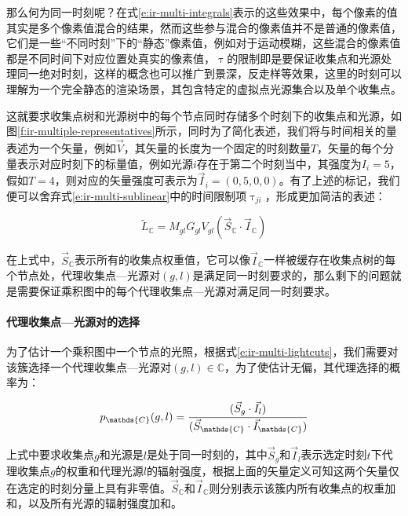 那么何为同一时刻呢？在式\ref{e:ir-multi-integrals}表示的这些效果中，每个像素的值其实是多个像素值混合的结果，然而这些参与混合的像素值并不是普通的像素值，它们是一些“不同时刻”下的“静态”像素值，例如对于运动模糊，这些混合的像素值都是不同时间下对应位置处真实的像素值，$\uptau$的限制即是要保证收集点和光源处理同一绝对时刻，这样的概念也可以推广到景深，反走样等效果，这里的时刻可以理解为一个完全静态的渲染场景，其包含特定的虚拟点光源集合以及单个收集点。

这就要求收集点树和光源树中的每个节点同时存储多个时刻下的收集点和光源，如图\ref{f:ir-multiple-representatives}所示，同时为了简化表述，我们将与时间相关的量表述为一个矢量，例如$\vec{V}$，其矢量的长度为一个固定的时刻数量$T$，矢量的每个分量表示对应时刻下的标量值，例如光源$i$存在于第二个时刻当中，其强度为$I_i=5$，假如$T=4$，则对应的矢量强度可表示为$\vec{I}_i=(0,5,0,0)$。有了上述的标记，我们便可以舍弃式\ref{e:ir-multi-sublinear}中的时间限制项$\uptau_{ji}$，形成更加简洁的表述：

\begin{equation}\label{e:ir-multi-lightcuts}
	\tilde{L}_{\mathds{C}}=M_{gl}G_{gl}V_{gl}(\vec{S}_{\mathds{C}}\cdot \vec{I}_{\mathds{C}})
\end{equation}

\noindent 在上式中，$\vec{S}_{\mathds{C}}$表示所有的收集点权重值，它可以像$\vec{I}_{\mathds{C}}$一样被缓存在收集点树的每个节点处，代理收集点—光源对$(g,l)$是满足同一时刻要求的，那么剩下的问题就是需要保证乘积图中的每个代理收集点—光源对满足同一时刻要求。




\paragraph{代理收集点—光源对的选择}
为了估计一个乘积图中一个节点的光照，根据式\ref{e:ir-multi-lightcuts}，我们需要对该簇选择一个代理收集点—光源对$(g,l)\in\mathds{C}$，为了使估计无偏，其代理选择的概率为：

\begin{equation}
	p_{\mathds{C}}(g,l)= \cfrac{(\vec{S}_g \cdot \vec{I}_l)}{(\vec{S}_{\mathds{C}}\cdot \vec{I}_{\mathds{C}})}
\end{equation}

\noindent 上式中要求收集点$g$和光源是$l$是处于同一时刻的，其中$\vec{S}_g$和$\vec{I}_l$表示选定时刻$t$下代理收集点$g$的权重和代理光源$l$的辐射强度，根据上面的矢量定义可知这两个矢量仅在选定的时刻分量上具有非零值。$\vec{S}_{\mathds{C}}$和$\vec{I}_{\mathds{C}}$则分别表示该簇内所有收集点的权重加和，以及所有光源的辐射强度加和。

